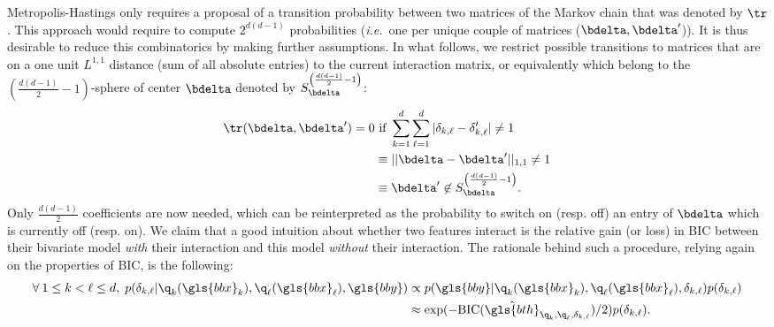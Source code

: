Metropolis-Hastings only requires a proposal of a transition probability between two matrices of the Markov chain that was denoted by $\tr$. This approach would require to compute $2^{d(d-1)}$ probabilities (\textit{i.e.}\ one per unique couple of matrices ($\bdelta,\bdelta'$)). It is thus desirable to reduce this combinatorics by making further assumptions. In what follows, we restrict possible transitions to matrices that are on a one unit $L^{1,1}$ distance (sum of all absolute entries) to the current interaction matrix, or equivalently which belong to the $\left( \frac{d(d-1)}{2}-1 \right)$-sphere of center $\bdelta$ denoted by $S^{\left( \frac{d(d-1)}{2}-1 \right)}_{\bdelta}$: 
\begin{align*}
\tr(\bdelta,\bdelta') = 0 & \text{ if } \sum_{k=1}^d \sum_{\ell=1}^d |\delta_{k,\ell} - \delta'_{k,\ell}| \neq 1 \\
 & \equiv ||\bdelta - \bdelta'||_{1,1} \neq 1 \\
 & \equiv \bdelta' \not\in S^{\left( \frac{d(d-1)}{2}-1 \right)}_{\bdelta}.
\end{align*}
Only $\frac{d(d-1)}{2}$ coefficients are now needed, which can be reinterpreted as the probability to switch on (resp. off) an entry of $\bdelta$ which is currently off (resp. on). We claim that a good intuition about whether two features interact is the relative gain (or loss) in BIC between their bivariate model \textit{with} their interaction and this model \textit{without} their interaction. The rationale behind such a procedure, relying again on the properties of BIC, is the following: 
\begin{align*}
\forall \: 1 \leq k < \ell \leq d, \; p(\delta_{k,\ell} | \q_k(\gls{bbx}_k), \q_\ell(\gls{bbx}_\ell), \gls{bby}) & \propto p(\gls{bby} | \q_k(\gls{bbx}_k), \q_\ell(\gls{bbx}_\ell), \delta_{k,\ell}) p(\delta_{k,\ell}) \\
& \approx \exp(-\text{BIC}(\hat{\gls{bth}}_{\q_k,\q_\ell,\delta_{k,\ell}})/2) p(\delta_{k,\ell}).
\end{align*}

